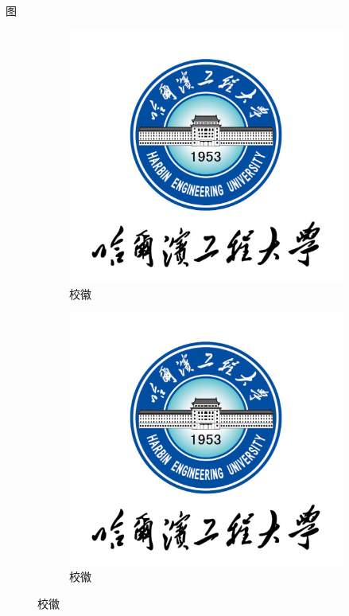 \documentclass{beamer}%
\begin{document}
	   \begin{frame}{图}
		\begin{figure}[htb]
			\label{fig:example}
			\begin{subfigure}{.45\textwidth}
				\centering
				\includegraphics[width=\textwidth]{badge.jpeg}
				\caption{校徽}
				\label{fig:logoa}
			\end{subfigure}
			\begin{subfigure}{.45\textwidth}
				\centering
				\includegraphics[width=\textwidth]{badge.jpeg}
				\caption{校徽}
				\label{fig:logob}
			\end{subfigure}
			\caption{校徽}
		\end{figure}
	\end{frame}
	
\end{document}
